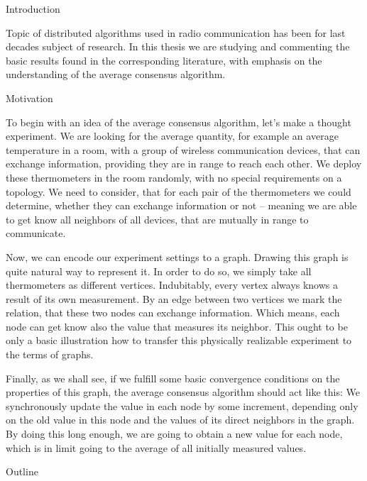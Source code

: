 
\def\ctustyle{{\tenss CTUstyle}}
\def\ttb{\tt\char'\\} %

\chap Introduction

Topic of distributed algorithms used in radio communication has been for last decades subject of research. In this thesis we are studying  and commenting the basic results found in the corresponding literature, with emphasis on the understanding of the average consensus algorithm.

\sec Motivation

To begin with an idea of the average consensus algorithm, let's make a thought experiment. We are looking for the average quantity, for example an average temperature in a room, with a group of wireless communication devices, that can exchange information, providing they are in range to reach each other. We deploy these thermometers in the room randomly, with no special requirements on a topology. We need to consider, that for each pair of the thermometers we could determine, whether they can exchange information or not -- meaning we are able to get know all neighbors of all devices, that are mutually in range to communicate.

Now, we can encode our experiment settings to a graph. Drawing this graph is  quite natural way to represent it. In order to do so, we simply take all thermometers as different vertices. Indubitably, every vertex always knows a result of its own measurement. By an edge between two vertices we mark the relation, that these two nodes can exchange information. Which means, each node can get know also the value that measures its neighbor. This ought to be only a basic illustration how to transfer this physically realizable experiment to the terms of graphs.

Finally, as we shall see, if we fulfill some basic convergence conditions on the properties of this graph, the average consensus algorithm should act like this: We synchronously update the value in each node by some increment, depending only on the old value in this node and the values of its direct neighbors in the graph. By doing this long enough, we are going to obtain a new value for each node, which is in limit going to the average of all initially measured values.

\sec Outline



